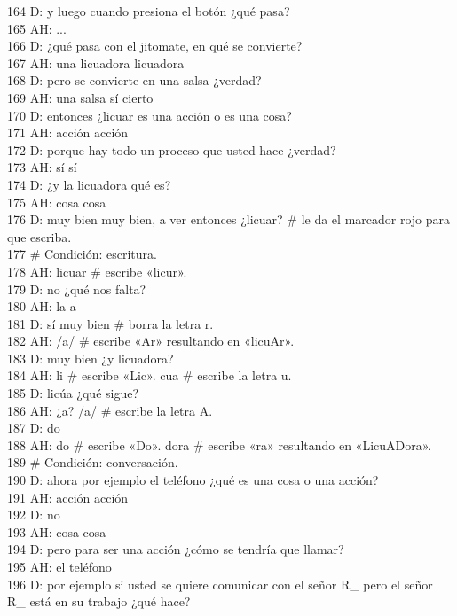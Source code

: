 164 D: y luego cuando presiona el botón ¿qué pasa?\\
165 AH: ...\\
166 D: ¿qué pasa con el jitomate, en qué se convierte?\\
167 AH: una licuadora licuadora\\
168 D: pero se convierte en una salsa ¿verdad?\\
169 AH: una salsa sí cierto\\
170 D: entonces ¿licuar es una acción o es una cosa?\\
171 AH: acción acción\\
172 D: porque hay todo un proceso que usted hace ¿verdad?\\
173 AH: sí sí\\
174 D: ¿y la licuadora qué es?\\
175 AH: cosa cosa\\
176 D: muy bien muy bien, a ver entonces ¿licuar? \# le da el marcador rojo para que escriba.\\
177 \# Condición: escritura.\\
178 AH: licuar \# escribe «licur». \\
179 D: no ¿qué nos falta?\\
180 AH: la a\\
181 D: sí muy bien \# borra la letra r.\\
182 AH: /a/ \# escribe «Ar» resultando en «licuAr».\\
183 D: muy bien ¿y licuadora?\\
184 AH: li \# escribe «Lic». cua \# escribe la letra u.\\
185 D: licúa ¿qué sigue?\\
186 AH: ¿a? /a/ \# escribe la letra A.\\
187 D: do\\
188 AH: do \# escribe «Do». dora \# escribe «ra» resultando en «LicuADora».\\
189 \# Condición: conversación.\\
190 D: ahora por ejemplo el teléfono ¿qué es una cosa o una acción?\\
191 AH: acción acción\\
192 D: no\\
193 AH: cosa cosa\\
194 D: pero para ser una acción ¿cómo se tendría que llamar?\\
195 AH: el teléfono\\
196 D: por ejemplo si usted se quiere comunicar con el señor R\_ pero el señor R\_ está en su trabajo ¿qué hace?\\
